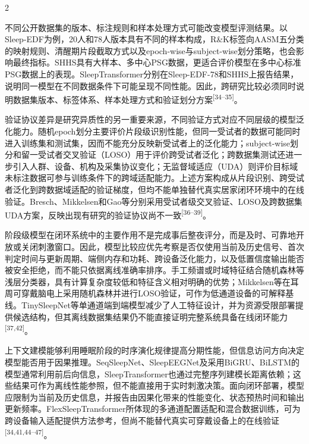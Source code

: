 \documentclass[UTF8,zihao=5,fontset=none]{ctexart}
\newcommand{\song}{\CJKfamily{song}}
\newcommand{\levelthree}[1]{%
  \par\noindent{\song\fontsize{10.5pt}{15.6pt}\selectfont #1}}
\newcommand{\refcite}[1]{\nolinebreak[4]\textsuperscript{[#1]}}
\begin{document}
\begin{multicols}{2}

不同公开数据集的版本、标注规则和样本处理方式可能改变模型评测结果。以Sleep-EDF为例，20人和78人版本具有不同的样本构成，R\&K标签向AASM五分类的映射规则、清醒期片段截取方式以及epoch-wise与subject-wise划分策略，也会影响最终指标。SHHS具有大样本、多中心PSG数据，更适合评价模型在多中心标准PSG数据上的表现。SleepTransformer分别在Sleep-EDF-78和SHHS上报告结果，说明同一模型在不同数据条件下可能呈现不同性能。因此，跨研究比较必须同时说明数据集版本、标签体系、样本处理方式和验证划分方案\refcite{34--35}。\par

验证协议差异是研究异质性的另一重要来源，不同验证方式对应不同层级的模型泛化能力。随机epoch划分主要评价片段级识别性能，但同一受试者的数据可能同时进入训练集和测试集，因而不能充分反映新受试者上的泛化能力；subject-wise划分和留一受试者交叉验证（LOSO）用于评价跨受试者泛化；跨数据集测试还进一步引入人群、设备、机构及采集协议变化；无监督域适应（UDA）则评价目标域未标注数据可参与训练条件下的跨域适配能力。上述方案构成从片段识别、跨受试者泛化到跨数据域适配的验证梯度，但均不能单独替代真实居家闭环环境中的在线验证。Bresch、Mikkelsen和Gao等分别采用受试者级交叉验证、LOSO及跨数据集UDA方案，反映出现有研究的验证协议尚不一致\refcite{36--39}。\par

\levelthree{2.2.3 阶段级表征与上下文模型}
阶段级模型在闭环系统中的主要作用不是完成事后整夜评分，而是及时、可靠地开放或关闭刺激窗口。因此，模型比较应优先考察是否仅使用当前及历史信号、首次判定时间与更新周期、端侧内存和功耗、跨设备泛化能力，以及低置信度输出能否被安全拒绝，而不能只依据离线准确率排序。手工频谱或时域特征结合随机森林等浅层分类器，具有计算复杂度较低和特征含义相对明确的优势；Mikkelsen等在耳周可穿戴脑电上采用随机森林并进行LOSO验证，可作为低通道设备的可解释基线。TinySleepNet等单通道端到端模型减少了人工特征设计，并为资源受限部署提供候选结构，但其离线数据集结果仍不能直接证明完整系统具备在线闭环能力\refcite{37,42}。\par

上下文建模能够利用睡眠阶段的时序演化规律提高分期性能，但信息访问方向决定模型能否用于因果推理。SeqSleepNet、SleepEEGNet及采用BiGRU、BiLSTM的模型通常利用前后向信息，SleepTransformer也通过完整序列建模长距离依赖；这些结果可作为离线性能参照，但不能直接用于实时刺激决策。面向闭环部署，模型应限制为当前及历史信息，并报告由因果化带来的性能变化、状态预热时间和输出更新频率。FlexSleepTransformer所体现的多通道配置适配和混合数据训练，可为跨设备输入适配提供方法参考，但尚不能替代真实可穿戴设备上的在线验证\refcite{34,41,44--47}。\par


\end{multicols}
\end{document}
